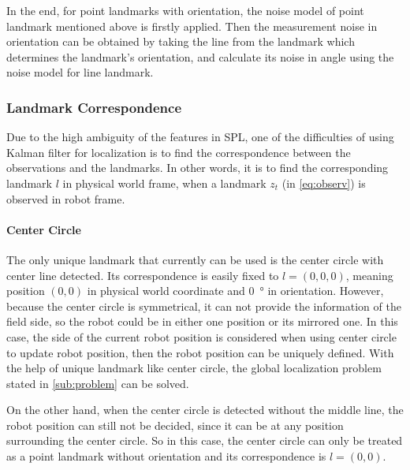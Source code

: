 In the end, for point landmarks with orientation, the noise model of point landmark mentioned above is firstly applied. Then the measurement noise in orientation can be obtained by taking the line from the landmark which determines the landmark's orientation, and calculate its noise in angle using the noise model for line landmark.


\subsubsection{Landmark Correspondence}\label{subsub:landmarkco}
Due to the high ambiguity of the features in \gls{SPL}, one of the difficulties of using Kalman filter for localization is to find the correspondence between the observations and the landmarks. In other words, it is to find the corresponding landmark $l$ in physical world frame, when a landmark $z_t$ (in \autoref{eq:observ}) is observed in robot frame. 

\paragraph{Center Circle}
The only unique landmark that currently can be used is the center circle with center line detected. Its correspondence is easily fixed to $l = (0,0,0)$, meaning position $(0,0)$ in physical world coordinate and \SI{0}{\degree} in orientation. However, because the center circle is symmetrical, it can not provide the information of the field side, so the robot could be in either one position or its mirrored one. In this case, the side of the current robot position is considered when using center circle to update robot position, then the robot position can be uniquely defined. With the help of unique landmark like center circle, the global localization problem stated in \autoref{sub:problem} can be solved.

On the other hand, when the center circle is detected without the middle line, the robot position can still not be decided, since it can be at any position surrounding the center circle. So in this case, the center circle can only be treated as a point landmark without orientation and its correspondence is $l = (0,0)$.


